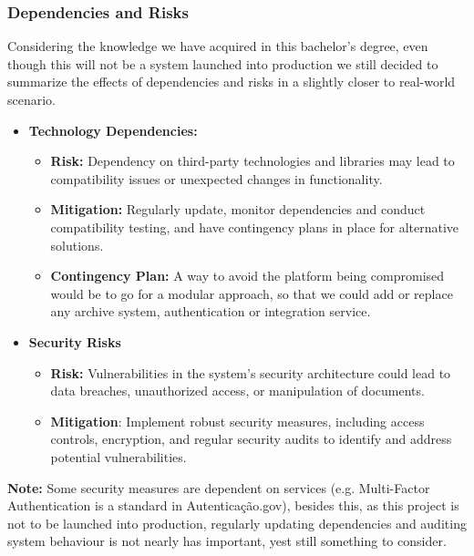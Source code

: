 \documentclass[a4paper,11pt]{article}
\begin{document}
            \subsubsection{Dependencies and Risks}
            \quad Considering the knowledge we have acquired in this bachelor's degree, even though this will not be a system launched into production we still decided to summarize the effects of dependencies and risks in a slightly closer to real-world scenario.
                \begin{itemize}
                    \item \textbf{Technology Dependencies:}
                    \begin{itemize}
                        \item \textbf{Risk:} Dependency on third-party technologies and libraries may lead to compatibility issues or unexpected changes in functionality.
                        \item \textbf{Mitigation:} Regularly update, monitor dependencies and conduct compatibility testing, and have contingency plans in place for alternative solutions.
                        \item \textbf{Contingency Plan:} A way to avoid the platform being compromised would be to go for a modular approach, so that we could add or replace any archive system, authentication or integration service.
                    \end{itemize}
                    \item \textbf{Security Risks}
                    \begin{itemize}
                        \item \textbf{Risk:} Vulnerabilities in the system's security architecture could lead to data breaches, unauthorized access, or manipulation of documents.
                        \item \textbf{Mitigation}: Implement robust security measures, including access controls, encryption, and regular security audits to identify and address potential vulnerabilities.
                    \end{itemize}
                \end{itemize}

                 \textbf{Note:} Some security measures are dependent on services (e.g. Multi-Factor Authentication is a standard in Autenticação.gov), besides this, as this project is not to be launched into production, regularly updating dependencies and auditing system behaviour is not nearly has important, yest still something to consider.
        
\end{document}
